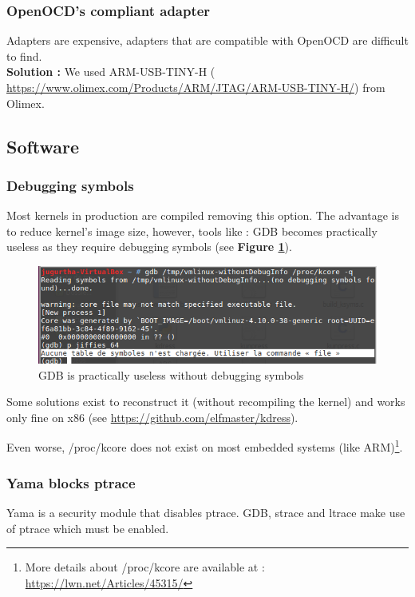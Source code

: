 \subsubsection{OpenOCD's compliant adapter}
Adapters are expensive, adapters that are compatible with OpenOCD are difficult to find.\\
\textbf{Solution : } We used ARM-USB-TINY-H ({\color{blue} \url{https://www.olimex.com/Products/ARM/JTAG/ARM-USB-TINY-H/}}) from Olimex.

\subsection{Software}

\subsubsection{Debugging symbols}
Most kernels in production are compiled removing this option. The advantage is to reduce kernel's image size, however, tools like : GDB becomes practically useless as they require debugging symbols (see \textbf{Figure \ref{GDB is practically useless without debugging symbols}}). 

\begin{figure}[H]
		\centering
        \includegraphics[scale=0.40]{img/issues/no-debug-symbol.png}
        \caption{GDB is practically useless without debugging symbols}
        \label{GDB is practically useless without debugging symbols}
    \end{figure}


Some solutions exist to reconstruct it (without recompiling the kernel) and works only fine on x86 (see {\color{blue}\url{https://github.com/elfmaster/kdress}}).




Even worse, /proc/kcore does not exist on most embedded systems (like ARM)\footnote{More details about /proc/kcore are available at :  {\color{blue}\url{https://lwn.net/Articles/45315/}}}.


\subsubsection{Yama blocks ptrace}
Yama is a security module that disables ptrace. GDB, strace and ltrace make use of ptrace which must be enabled.\\

